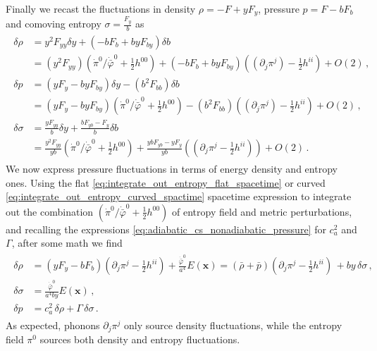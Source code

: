 Finally we recast the fluctuations in density $\rho=-F+yF_y$, pressure $p=F-bF_b$ and comoving entropy $\sigma=\tfrac{F_y}{b}$ as
\begin{align}\label{eq:rho_p_fluctuations_via_b_y}
\begin{aligned}
    \delta\rho &= y^2F_{yy}\delta y + (-bF_b+byF_{by})\delta b
    \\
    &= (y^2F_{yy})\left(\dot{\pi}^0/\dot{\bar{\varphi}}^0  +\tfrac12 h^{00}\right) + (-bF_b+byF_{by})\left((\partial_j \pi^j)-\tfrac12 h^{ii} \right) + O(2)\,,
    \\[3pt]
    \delta p &= (yF_y-byF_{by})\delta y - (b^2 F_{bb})\delta b
    \\
    &= (yF_y-byF_{by})\left(\dot{\pi}^0/\dot{\bar{\varphi}}^0  +\tfrac12 h^{00}\right) - (b^2 F_{bb})\left((\partial_j \pi^j)-\tfrac12 h^{ii}\right)+ O(2)\,,
    \\[3pt]
    \delta\sigma &= \tfrac{yF_{yy}}{b}\delta y + \tfrac{bF_{yb}-F_y}{b} \delta b
    \\
    &= \tfrac{y^2F_{yy}}{yb}\left(\dot{\pi}^0/\dot{\bar{\varphi}}^0  +\tfrac12 h^{00}\right) +\tfrac{ybF_{yb}-yF_y}{yb}\left((\partial_j \pi^j-\tfrac12 h^{ii} )\right)+ O(2)\,.
\end{aligned}
\end{align}
We now express pressure fluctuations in terms of energy density and entropy ones.
Using the flat \eqref{eq:integrate_out_entropy_flat_spacetime} or curved \eqref{eq:integrate_out_entropy_curved_spactime} spacetime expression to integrate out the combination $\left(\dot{\pi}^0/\dot{\bar{\varphi}}^0  +\tfrac12 h^{00}\right)$ of entropy field and metric perturbations, and recalling the expressions \eqref{eq:adiabatic_cs_nonadiabatic_pressure} for $c_a^2$ and $\Gamma$, after some math we find
\begin{align}\label{eq:rho_p_sigma_fluctuations_vs_phonon_entropy_field}
\begin{aligned}
    \delta\rho &= (yF_y-bF_b)(\partial_j\pi^j-\tfrac12 h^{ii})+\tfrac{\dot{\bar{\varphi}}^0}{a^4}E(\mathbf{x}) = (\bar{\rho}+\bar{p})(\partial_j\pi^j-\tfrac12h^{ii})\,+by\,\delta\sigma \,,\\[2.5pt]
    \delta\sigma &= \frac{\dot{\bar{\varphi}}^0}{a^4by}E(\mathbf{x})\,,\\[2.5pt]
    \delta p &= c_a^2\, \delta\rho + \Gamma \, \delta\sigma\,.
\end{aligned}
\end{align}
As expected, phonons $\partial_j\pi^j$ only source density fluctuations, while the entropy field $\pi^0$ sources both density and entropy fluctuations. 




